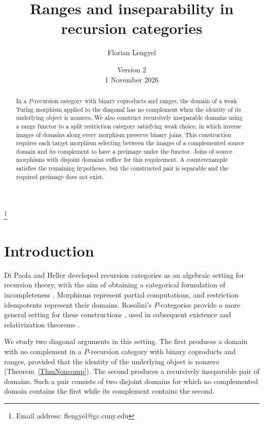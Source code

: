 \documentclass[letterpaper,10pt]{amsart}
\theoremstyle{plain}
\theoremstyle{definition}
\begin{document}
\title{Ranges and inseparability in recursion categories}
\author{Florian Lengyel}
\date{Version 2\\1 November 2026}
\thanks{Email address: flengyel@gc.cuny.edu}
\address{The Graduate School and University Center, %
Ph.D Program in Computer Science, %
The City University of New York, 365 Fifth Avenue, New York, NY %
10016}


\begin{abstract}
In a $P$-recursion category with binary coproducts and ranges, the
domain of a weak Turing morphism applied to the diagonal has no
complement when the identity of its underlying object is nonzero.
We also construct recursively inseparable domains using a range functor
to a split restriction category satisfying weak choice, in which inverse
images of domains along every morphism preserve binary joins.
This construction requires each target morphism selecting between the
images of a complemented source domain and its complement to have a preimage under
the functor. Joins of source morphisms with disjoint domains suffice
for this requirement. A counterexample satisfies the remaining
hypotheses, but the constructed pair is separable and the required
preimage does not exist.

\end{abstract}

\maketitle

\section{Introduction}
Di Paola and Heller developed recursion categories as an algebraic
setting for recursion theory, with the aim of obtaining a categorical
formulation of incompleteness \cite{MR88i:03078}. Morphisms represent
partial computations, and restriction idempotents represent their
domains. Rosolini's $P$-categories provide a more general setting for
these constructions \cite{coneit,MR90e:18001}, used in subsequent
existence and relativization theorems
\cite{MR92e:03067,MR95c:03110,leng}.

We study two diagonal arguments in this setting. The first produces a
domain with no complement in a $P$-recursion category with binary
coproducts and ranges, provided that the identity of the underlying
object is nonzero (Theorem~\ref{ThmNoncomp}). The second produces a
recursively inseparable pair of domains. Such a pair consists of two
disjoint domains for which no complemented domain contains the first
while its complement contains the second.
\end{document}
